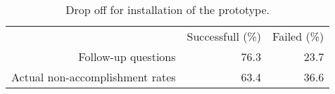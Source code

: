 \begin{table}
  \begin{tabular}{rrr}

    &
    \multicolumn{1}{c}{Successfull (\%)} &
    \multicolumn{1}{c}{Failed (\%)} \\

    \cmidrule(lr){2-3}

    Follow-up questions &
    76.3 &
    23.7 \\

    Actual non-accomplishment rates &
    63.4 &
    36.6 \\

  \end{tabular}
  \caption[Prototype Installation Drop Off]{%
    Drop off for installation of the prototype.
  }
  \label{table:prototype.installation.drop.off}
\end{table}
